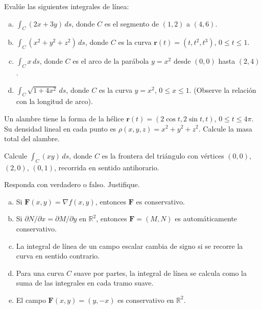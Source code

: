 \begin{prob}
Evalúe las siguientes integrales de línea:
\begin{enumerate}[a)]
  \item \(\displaystyle \int_C (2x + 3y)\,ds\), donde \(C\) es el
  segmento de \((1,2)\) a \((4,6)\).
  \item \(\displaystyle \int_C (x^2 + y^2 + z^2)\,ds\), donde \(C\) es
  la curva \(\mathbf{r}(t) = (t, t^2, t^3)\), \(0\le t\le 1\).
  \item \(\displaystyle \int_C x\,ds\), donde \(C\) es el arco de
  la parábola \(y = x^2\) desde \((0,0)\) hasta \((2,4)\).
  \item \(\displaystyle \int_C \sqrt{1 + 4x^2}\,ds\), donde \(C\) es
  la curva \(y = x^2\), \(0\le x\le 1\). (Observe la relación con
  la longitud de arco).
\end{enumerate}
\end{prob}

\begin{prob}
Un alambre tiene la forma de la hélice \(\mathbf{r}(t) = (2\cos t,
2\sin t, t)\), \(0 \le t \le 4\pi\). Su densidad lineal en cada punto
es \(\rho(x,y,z) = x^2 + y^2 + z^2\). Calcule la masa total del alambre.
\end{prob}

\begin{prob}
Calcule \(\displaystyle \int_C (xy)\,ds\), donde \(C\) es la frontera
del triángulo con vértices \((0,0)\), \((2,0)\), \((0,1)\), recorrida
en sentido antihorario.
\end{prob}

\begin{prob}
Responda con verdadero o falso. Justifique.
\begin{enumerate}[a)]
  \item Si \(\mathbf{F}(x,y) = \nabla f(x,y)\), entonces
  \(\mathbf{F}\) es conservativo.
  \item Si \(\partial N/\partial x = \partial M/\partial y\) en
  \(\mathbb{R}^2\), entonces \(\mathbf{F} = (M,N)\) es
  automáticamente conservativo.
  \item La integral de línea de un campo escalar cambia de signo
  si se recorre la curva en sentido contrario.
  \item Para una curva \(C\) suave por partes, la integral de línea
  se calcula como la suma de las integrales en cada tramo suave.
  \item El campo \(\mathbf{F}(x,y) = (y, -x)\) es conservativo en
  \(\mathbb{R}^2\).
\end{enumerate}
\end{prob}

